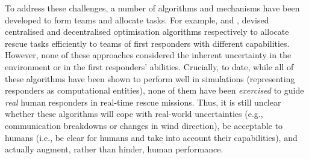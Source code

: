 To address these challenges, a number of algorithms and mechanisms have been developed to form teams and allocate tasks. For example, \cite{ramchurn:etal:2010,Scerri2005} and \cite{Chapman2009}, devised centralised and decentralised optimisation algorithms respectively to allocate rescue tasks efficiently to teams of first responders with different capabilities. However, none of these approaches considered the inherent uncertainty in the environment or in the first responders' abilities. Crucially, to date, while all of these algorithms have been shown to perform well in simulations (representing responders as computational entities), none of them have been \emph{exercised} to guide \emph{real} human responders in real-time rescue missions. Thus, it is still unclear whether these algorithms will cope with real-world uncertainties (e.g., communication breakdowns or changes in wind direction), be acceptable to humans (i.e., be clear for humans and take into account their capabilities), and actually augment, rather than hinder,  human performance.
\\


